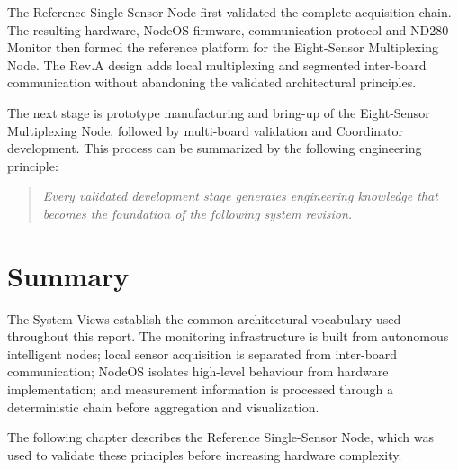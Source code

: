 The Reference Single-Sensor Node first validated the complete acquisition chain. The resulting hardware, NodeOS firmware, communication protocol and ND280 Monitor then formed the reference platform for the Eight-Sensor Multiplexing Node. The Rev.A design adds local multiplexing and segmented inter-board communication without abandoning the validated architectural principles.

The next stage is prototype manufacturing and bring-up of the Eight-Sensor Multiplexing Node, followed by multi-board validation and Coordinator development. This process can be summarized by the following engineering principle:

\begin{quote}
\emph{Every validated development stage generates engineering knowledge that becomes the foundation of the following system revision.}
\end{quote}

\section{Summary}

The System Views establish the common architectural vocabulary used throughout this report. The monitoring infrastructure is built from autonomous intelligent nodes; local sensor acquisition is separated from inter-board communication; NodeOS isolates high-level behaviour from hardware implementation; and measurement information is processed through a deterministic chain before aggregation and visualization.

The following chapter describes the Reference Single-Sensor Node, which was used to validate these principles before increasing hardware complexity.
